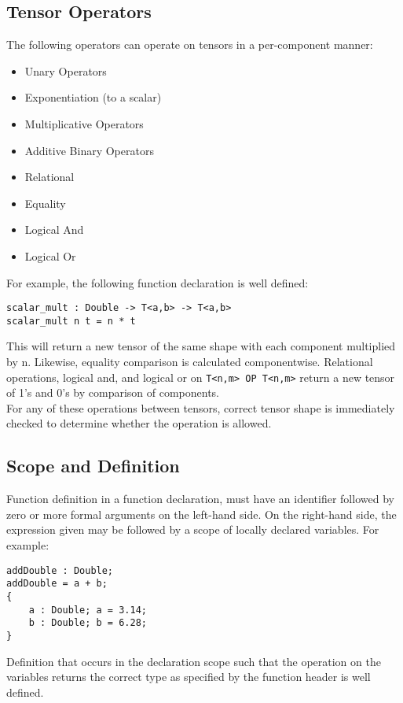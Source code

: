 \subsection{Tensor Operators}
The following operators can operate on tensors in a per-component manner:
\begin{itemize}
    \item Unary Operators
    \item Exponentiation (to a scalar)
    \item Multiplicative Operators
    \item Additive Binary Operators
    \item Relational 
    \item Equality
    \item Logical And
    \item Logical Or
\end{itemize}
For example, the following function declaration is well defined:
\begin{lstlisting}
scalar_mult : Double -> T<a,b> -> T<a,b>
scalar_mult n t = n * t
\end{lstlisting}
This will return a new tensor of the same shape with each component multiplied
by n. Likewise, equality comparison is calculated componentwise. Relational
operations, logical and, and logical or  on \verb|T<n,m> OP T<n,m>| return a 
new tensor of 1's and 0's by comparison of components.
\\
For any of these operations between tensors, correct tensor shape is immediately checked to
determine whether the operation is allowed.

\subsection{Scope and Definition}
Function definition in a function declaration, must have an
identifier followed by zero or more formal arguments on the left-hand side. On
the right-hand side, the expression given may be followed by a scope of locally
declared variables. For example:
\begin{lstlisting}
addDouble : Double; 
addDouble = a + b; 
{ 
    a : Double; a = 3.14;
    b : Double; b = 6.28;
}
\end{lstlisting}
Definition that occurs in the declaration scope such that the operation 
on the variables returns the correct type as specified by the function header
is well defined.

